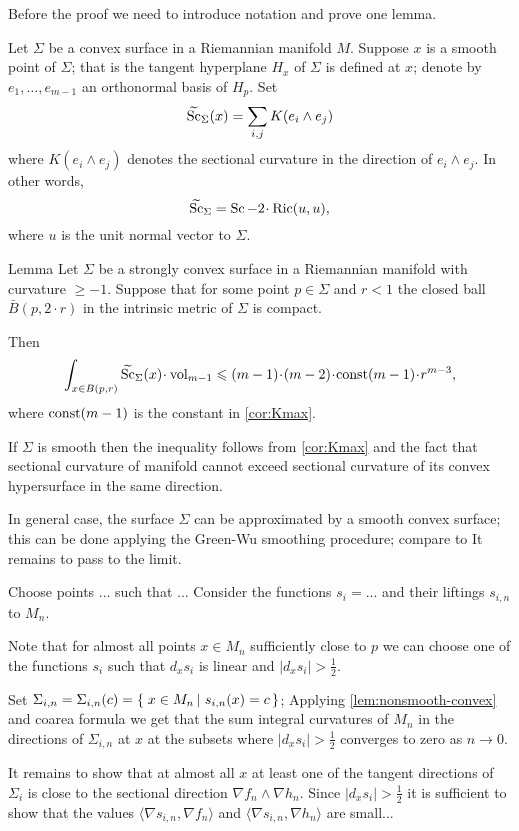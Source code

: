Before the proof we need to introduce notation and prove one lemma.

Let $\Sigma$ be a convex surface in a Riemannian manifold $M$.
Suppose $x$ is a smooth point of $\Sigma$; that is the tangent hyperplane $H_x$ of $\Sigma$ is defined at $x$;
denote by $e_1,\dots,e_{m-1}$ an orthonormal basis of $H_p$.
Set 
\[\widetilde{\operatorname{\rm Sc}}_\Sigma(x)= \sum_{i,j} K(e_i\wedge e_j)\]
where $K(e_i\wedge e_j)$ denotes the sectional curvature in the direction of $e_i\wedge e_j$.
In other words, 
\[\widetilde\Sc_\Sigma=\Sc-2\cdot\Ric(u,u),\]
where $u$ is the unit normal vector to $\Sigma$.

\begin{thm}{Lemma}\label{lem:nonsmooth-convex}
Let $\Sigma$ be a strongly convex surface in a Riemannian manifold with curvature $\ge -1$.
Suppose that for some point $p\in \Sigma$ and $r<1$ the closed ball $\bar B(p,2\cdot r)$ in the intrinsic metric of $\Sigma$ is compact.

Then 
\[\int_{x\in B(p,r)}\widetilde\Sc_\Sigma(x)\cdot \vol_{m-1}\le (m-1)\cdot(m-2)\cdot\const(m-1)\cdot r^{m-3},\]
where $\mathrm{const}(m-1)$ is the constant in \ref{cor:Kmax}.
\end{thm}

 If $\Sigma$ is smooth then the inequality follows from \ref{cor:Kmax} and the fact that sectional curvature of manifold cannot exceed sectional curvature of its convex hypersurface in the same direction.

In general case, the surface $\Sigma$ can be approximated by a smooth convex surface;
this can be done applying the Green-Wu smoothing procedure; compare to \cite{AKP-buyalo}
It remains to pass to the limit.
\qeds

Choose points ... such that ...
Consider the functions $s_i=...$ and their liftings $s_{i,n}$ to $M_n$.

Note that for almost all points $x\in M_n$ sufficiently close to $p$ 
we can choose one of the functions $s_i$ such that $d_xs_i$ is linear and $|d_xs_i|>\tfrac12$.

Set $\Sigma_{i,n}=\Sigma_{i,n}(c)=\set{x\in M_n}{s_{i,n}(x)=c}$;
Applying \ref{lem:nonsmooth-convex} and coarea formula we get that the sum integral curvatures of $M_n$ in the directions of $\Sigma_{i,n}$ at $x$ at the subsets where $|d_xs_i|>\tfrac12$ converges to zero as $n\to 0$.

It remains to show that at almost all $x$ at least one of the tangent directions of $\Sigma_i$ is close to the sectional direction $\nabla f_n\wedge\nabla h_n$.
Since $|d_xs_i|>\tfrac12$ it is sufficient to show that the values $\langle \nabla s_{i,n},\nabla f_n\rangle$ and $\langle \nabla s_{i,n},\nabla h_n\rangle$ are small...
\qeds


